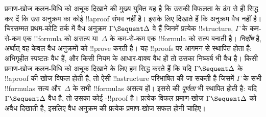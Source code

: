 \documentclass[../../../include/open-logic-section]{subfiles}
\begin{document}
प्रमाण-खोज कलन-विधि को अचूक दिखाने की मुख्य युक्ति यह है कि उसकी विफलता के
ढंग से ही सिद्ध कर दें कि उस अनुक्रम का कोई !!a{proof} संभव नहीं है। इसके लिए
दिखाते हैं कि अनुक्रम वैध नहीं है। चिरसम्मत प्रथम-कोटि तर्क में वैध अनुक्रम
$\Gamma \Sequent \Delta$ वे हैं जिनमें प्रत्येक !!{structure}, $\Gamma$ के
कम-से-कम एक !!{formula} को असत्य या~$\Delta$ के कम-से-कम एक !!{formula} को
सत्य बनाती है।  \emph{निर्दोष} है, अर्थात् वह केवल वैध अनुक्रमों को
!!{prove} करती है। यह !!{proof}s पर आगमन से स्थापित होता है: अभिगृहीत स्पष्टतः
वैध हैं, और किसी नियम के आधार-वाक्य वैध हों तो उसका निष्कर्ष भी वैध है। किसी
प्रमाण-खोज कलन-विधि को अचूक दिखाने के लिए हम सिद्ध करते हैं कि यदि $\Gamma
\Sequent \Delta$ के !!a{proof} की खोज विफल होती है, तो ऐसी !!a{structure}
परिभाषित की जा सकती है जिसमें $\Gamma$ के सभी !!{formula}s सत्य और~$\Delta$
के सभी !!{formula}s असत्य हों। इससे  की \emph{पूर्णता} भी स्थापित
होती है: यदि $\Gamma \Sequent \Delta$ वैध है, तो उसका कोई
-!!{proof} है। प्रत्येक विफल प्रमाण-खोज $\Gamma \Sequent \Delta$ को
अवैध दिखाती है, इसलिए वैध अनुक्रम की प्रत्येक प्रमाण-खोज सफल होनी चाहिए।
\end{document}
